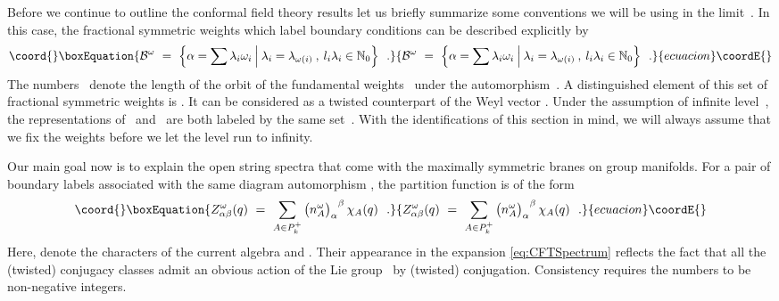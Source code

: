 \documentclass[12pt,a4paper]{article}
\providecommand{\Natural}{\mathbb{N}}
\providecommand{\mf}{\mathfrak} %
\providecommand{\mc}{\mathcal} %
\def\bL{\mc{B}} %
\def\areps{P_k^+} %
\def\reps{P^+} %
\def\tareps{\bL^\omega_k} %
\def\treps{\bL^\omega} %
\def\asg{{\hat{\mf{g}}}}
\def\a{\alpha}
\def\b{\beta}
\begin{document}
Before we continue to outline the conformal field theory 
results let us briefly summarize some conventions we will
be using in the limit~\coordHE{}. In this case, 
the fractional symmetric weights which label boundary 
conditions can be described explicitly by
\begin{equation}\coord{}\boxEquation{
\treps\ =\ \Bigl\{\alpha=\sum\lambda_i\omega_i\:\Bigl|\:
\lambda_i=\lambda_{\omega(i)}\:,\: l_i\lambda_i\in\Natural_0\Bigr\}\ \ .
}{
\treps\ =\ \Bigl\{\alpha=\sum\lambda_i\omega_i\:\Bigl|\:
\lambda_i=\lambda_{\omega(i)}\:,\: l_i\lambda_i\in\Natural_0\Bigr\}\ \ .
}{ecuacion}\coordE{}\end{equation}
The numbers~\coordHE{} denote the length of the orbit of the
fundamental weights~\coordHE{} under the automorphism~\myHighlight{$\omega$}\coordHE{}.
A distinguished element of this set of fractional symmetric
weights is \myHighlight{$\rho_\omega=(1/l_1,1/l_2,\cdots)\in\treps$}\coordHE{}. It can 
be considered as a twisted counterpart of the Weyl vector 
\myHighlight{$\rho=(1,1,\cdots)\in\reps$}\coordHE{}. Under the assumption of infinite 
level~\coordHE{}, the representations of~\myHighlight{$\mf{g}$}\coordHE{} and~\myHighlight{$\asg_k$}\coordHE{} are 
both labeled by the same set~\myHighlight{$\reps$}\coordHE{}. With the identifications 
of this section in mind, we will always assume that we fix the 
weights before we let the level run to infinity.
\medskip

Our main goal now is to explain the open string spectra that come
with the maximally symmetric branes on group manifolds. For a pair 
of boundary labels \myHighlight{$\alpha,\beta\in\tareps$}\coordHE{} associated with the 
same diagram automorphism \myHighlight{$\omega$}\coordHE{}, the partition function is of 
the form
\begin{equation}\coord{}\boxEquation{
  \label{eq:CFTSpectrum}
  Z^\omega_{\a \b}(q) \ 
  = \ \sum_{A\in\areps} {\bigl(n_A^\omega\bigr)_\alpha}^\beta\,\chi_A (q) \ \ . 
}{
  Z^\omega_{\a \b}(q) \ 
  = \ \sum_{A\in\areps} {\bigl(n_A^\omega\bigr)_\alpha}^\beta\,\chi_A (q) \ \ . 
}{ecuacion}\coordE{}\end{equation}
Here, \myHighlight{$\chi_A(q)$}\coordHE{} denote the characters of the current algebra 
\myHighlight{$\asg_k$}\coordHE{} and \myHighlight{$\a,\b\in\tareps$}\coordHE{}. Their appearance in the expansion 
\eqref{eq:CFTSpectrum} reflects the fact that all the (twisted) 
conjugacy classes admit an obvious action of the Lie group~\myHighlight{$G$}\coordHE{} 
by (twisted) conjugation. Consistency requires the numbers 
\myHighlight{${\bigl(n_A^\omega\bigr)_\alpha}^\beta$}\coordHE{} to be non-negative integers. 
\smallskip
\end{document}
